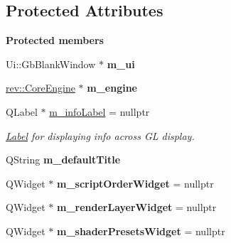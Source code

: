 \subsection*{Protected Attributes}
\begin{Indent}\textbf{ Protected members}\par
\begin{DoxyCompactItemize}
\item 
\mbox{\label{classrev_1_1_main_window_ae6fc0379097dae68d0363f4e07eb84cc}} 
Ui\+::\+Gb\+Blank\+Window $\ast$ {\bfseries m\+\_\+ui}
\item 
\mbox{\label{classrev_1_1_main_window_afd7475b223b71f24baeb77a82020d2b6}} 
\mbox{\hyperlink{classrev_1_1_core_engine}{rev\+::\+Core\+Engine}} $\ast$ {\bfseries m\+\_\+engine}
\item 
\mbox{\label{classrev_1_1_main_window_afa9a0214f263fbc0bae6d5da0e418a89}} 
Q\+Label $\ast$ \mbox{\hyperlink{classrev_1_1_main_window_afa9a0214f263fbc0bae6d5da0e418a89}{m\+\_\+info\+Label}} = nullptr
\begin{DoxyCompactList}\small\item\em \mbox{\hyperlink{classrev_1_1_label}{Label}} for displaying info across GL display. \end{DoxyCompactList}\item 
\mbox{\label{classrev_1_1_main_window_a9a70d3345fbe89a9c5f55a9fd18df4e6}} 
Q\+String {\bfseries m\+\_\+default\+Title}
\item 
\mbox{\label{classrev_1_1_main_window_a1650c07c6a04abde2f24845fe1207c52}} 
Q\+Widget $\ast$ {\bfseries m\+\_\+script\+Order\+Widget} = nullptr
\item 
\mbox{\label{classrev_1_1_main_window_ac6c7d03bdce6ccd4ae7c9597162fef09}} 
Q\+Widget $\ast$ {\bfseries m\+\_\+render\+Layer\+Widget} = nullptr
\item 
\mbox{\label{classrev_1_1_main_window_a40150e4c203c8fc26a08f65bdc9e6e5c}} 
Q\+Widget $\ast$ {\bfseries m\+\_\+shader\+Presets\+Widget} = nullptr
\item 
\mbox{\label{classrev_1_1_main_window_abe61daf13a58c0941b85a6657a5a6a43}} 

\end{DoxyCompactItemize}
\end{Indent}
